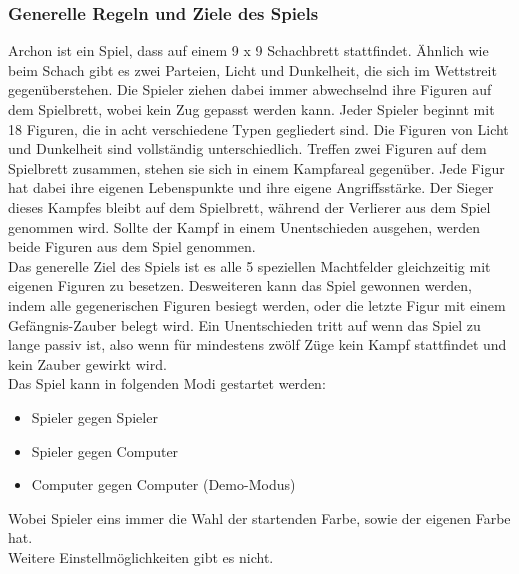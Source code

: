 \subsubsection{Generelle Regeln und Ziele des Spiels}
Archon ist ein Spiel, dass auf einem 9 x 9 Schachbrett stattfindet. Ähnlich wie beim Schach gibt es zwei Parteien, Licht und Dunkelheit, die sich im Wettstreit gegenüberstehen.
Die Spieler ziehen dabei immer abwechselnd ihre Figuren auf dem Spielbrett, wobei kein Zug gepasst werden kann. Jeder Spieler beginnt mit 18 Figuren, die in acht verschiedene Typen gegliedert sind. Die Figuren von Licht und Dunkelheit sind vollständig unterschiedlich. Treffen zwei Figuren auf dem Spielbrett zusammen, stehen sie sich in einem Kampfareal gegenüber. Jede Figur hat dabei ihre eigenen Lebenspunkte und ihre eigene Angriffsstärke. Der Sieger dieses Kampfes bleibt auf dem Spielbrett, während der Verlierer aus dem Spiel genommen wird. Sollte der Kampf in einem Unentschieden ausgehen, werden beide Figuren aus dem Spiel genommen.
\\Das generelle Ziel des Spiels ist es alle 5 speziellen Machtfelder gleichzeitig mit eigenen Figuren zu besetzen. 
Desweiteren kann das Spiel gewonnen werden, indem alle gegenerischen Figuren besiegt werden, oder die letzte Figur mit einem Gefängnis-Zauber belegt wird.
Ein Unentschieden tritt auf wenn das Spiel zu lange passiv ist, also wenn für mindestens zwölf Züge kein Kampf stattfindet und kein Zauber gewirkt wird.\\
Das Spiel kann in folgenden Modi gestartet werden: 
\begin{itemize}
	\item Spieler gegen Spieler
	\item Spieler gegen Computer
	\item Computer gegen Computer (Demo-Modus)
\end{itemize}
Wobei Spieler eins immer die Wahl der startenden Farbe, sowie der eigenen Farbe hat.\\Weitere Einstellmöglichkeiten gibt es nicht.

